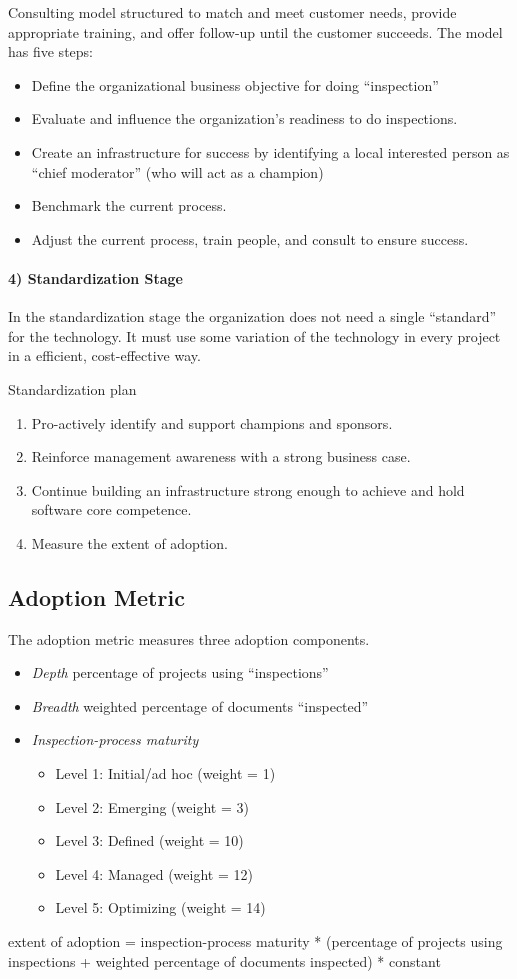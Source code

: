 Consulting model structured to match and meet customer needs, provide
appropriate training, and offer follow-up until the customer succeeds.  The
model has five steps:
\begin{itemize}
\item{Define the organizational business objective for doing
``inspection''}
\item{Evaluate and influence the organization's readiness to do
inspections.}
\item{Create an infrastructure for success by identifying a local
interested person as ``chief moderator'' (who will act as a champion)}
\item{Benchmark the current process.}
\item{Adjust the current process, train people, and consult to ensure
success.}
\end{itemize}

\paragraph{4) Standardization Stage}
In the standardization stage the organization does not need a single
``standard'' for the technology.  It must use some variation of the
technology in every project in a efficient, cost-effective way.

Standardization plan
\begin{enumerate}
\item{Pro-actively identify and support champions and sponsors.}
\item{Reinforce management awareness with a strong business case.}
\item{Continue building an infrastructure strong enough to achieve and hold
software core competence.}
\item{Measure the extent of adoption.}
\end{enumerate}

\subsection{Adoption Metric}

The adoption metric measures three adoption components.
\begin{itemize}
\item{{\em Depth} percentage of projects using ``inspections''}
\item{{\em Breadth} weighted percentage of documents ``inspected''}
\item{{\em Inspection-process maturity}}
  \begin{itemize}
  \item{Level 1: Initial/ad hoc (weight = 1)}
  \item{Level 2: Emerging (weight = 3)}
  \item{Level 3: Defined (weight = 10)}
  \item{Level 4: Managed (weight = 12)}
  \item{Level 5: Optimizing (weight = 14)}
  \end{itemize}
\end{itemize}

extent of adoption = inspection-process maturity * (percentage of projects
using inspections + weighted percentage of documents inspected) * constant


\cite{Grady94}




